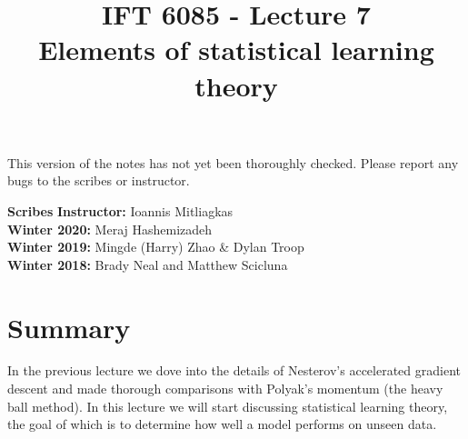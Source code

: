\documentclass{article}
\title{IFT 6085 - Lecture 7 \\ 
Elements of statistical learning theory}
\date{}
\begin{document}
 

\maketitle

\vspace{-0.5in}
\begin{center}
This version of the notes has not yet been thoroughly checked.
Please report any bugs to the scribes or instructor.
\end{center}
\vspace{0.2in}

\textbf{Scribes}\hfill
\textbf{Instructor:} Ioannis Mitliagkas\\
\textbf{Winter 2020:} Meraj Hashemizadeh\\
\textbf{Winter 2019:} Mingde (Harry) Zhao \& Dylan Troop\\
\textbf{Winter 2018:} Brady Neal and Matthew Scicluna
\hfill



\newcommand{\infgc}{\inf_{g \in \mathcal{C}}}
\newcommand{\supgc}{\sup_{g \in \mathcal{C}}}

\newcommand{\Prob}{\mathbb{P}}
\newcommand{\E}{\mathbb{E}}
\newcommand{\R}{\mathbb{R}}

\newcommand{\PP}{\mathbb{P}} %
\newcommand{\HH}{\mathcal{H}}   %
\newcommand{\X}{\mathcal{X}}    %
\newcommand{\Y}{\mathcal{Y}}    %
\newcommand{\D}{\mathcal{D}}    %
\newcommand{\yhat}{\hat{y}}     %
\newcommand{\Rhat}{\hat{R}_S}     %
\newcommand{\egen}{\epsilon_{\text{gen}}(h_S)}  %

\newcommand{\iid}{\textit{i.i.d.}}

\section{Summary}

In the previous lecture we dove into the details of Nesterov's accelerated gradient descent and made thorough comparisons with Polyak's momentum (the heavy ball method). In this lecture we will start discussing statistical learning theory, the goal of which is to determine how well a model performs on unseen data.
 
\end{document}
